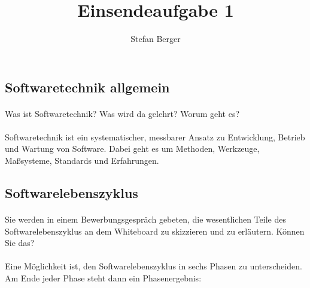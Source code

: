 \documentclass{article}
\begin{document}
\title{\Large Einsendeaufgabe 1}
\author{\normalsize Stefan Berger}
\date{}
\maketitle

\subsection{Softwaretechnik allgemein}
\paragraph{}
Was ist Softwaretechnik? Was wird da gelehrt? Worum geht es?

\paragraph{}
Softwaretechnik ist ein systematischer, messbarer Ansatz zu Entwicklung, Betrieb und Wartung von
Software. Dabei geht es um Methoden, Werkzeuge, Maßsysteme, Standards und
Erfahrungen.

\subsection{Softwarelebenszyklus}
\paragraph{}
Sie werden in einem Bewerbungsgespräch gebeten, die wesentlichen Teile des Softwarelebenszyklus an dem Whiteboard zu skizzieren und zu erläutern. Können Sie das?

\paragraph{}
Eine Möglichkeit ist, den Softwarelebenszyklus in sechs Phasen zu unterscheiden.
Am Ende jeder Phase steht dann ein Phasenergebnis:
\end{document}
